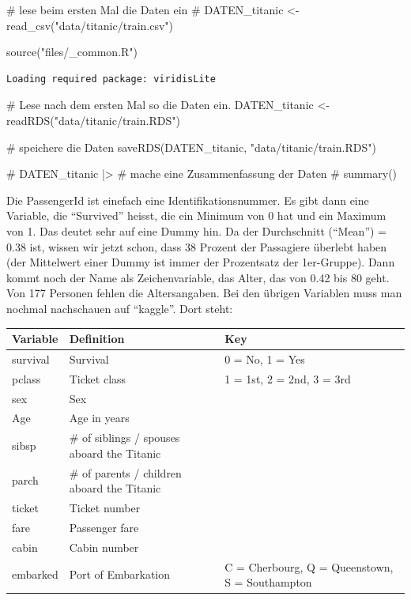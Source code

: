 \documentclass[
  10pt,
  letterpaper,
  a4paper, twoside]{scrreprt}
\newenvironment{Shaded}{\begin{snugshade}}{\end{snugshade}}
\newcommand{\CommentTok}[1]{\textcolor[rgb]{0.37,0.37,0.37}{#1}}
\newcommand{\FunctionTok}[1]{\textcolor[rgb]{0.28,0.35,0.67}{#1}}
\newcommand{\NormalTok}[1]{\textcolor[rgb]{0.00,0.23,0.31}{#1}}
\newcommand{\OtherTok}[1]{\textcolor[rgb]{0.00,0.23,0.31}{#1}}
\newcommand{\StringTok}[1]{\textcolor[rgb]{0.13,0.47,0.30}{#1}}
\begin{document}
\begin{Shaded}
\begin{Highlighting}[]
\CommentTok{\# lese beim ersten Mal die Daten ein}
\CommentTok{\# DATEN\_titanic \textless{}{-} read\_csv("data/titanic/train.csv") }

\FunctionTok{source}\NormalTok{(}\StringTok{"files/\_common.R"}\NormalTok{)}
\end{Highlighting}
\end{Shaded}

\begin{verbatim}
Loading required package: viridisLite
\end{verbatim}

\begin{Shaded}
\begin{Highlighting}[]
\CommentTok{\# Lese nach dem ersten Mal so die Daten ein.}
\NormalTok{DATEN\_titanic }\OtherTok{\textless{}{-}} \FunctionTok{readRDS}\NormalTok{(}\StringTok{"data/titanic/train.RDS"}\NormalTok{)}

\CommentTok{\# speichere die Daten}
\FunctionTok{saveRDS}\NormalTok{(DATEN\_titanic, }\StringTok{"data/titanic/train.RDS"}\NormalTok{) }

\CommentTok{\# DATEN\_titanic |\textgreater{} \# mache eine Zusammenfassung der Daten}
\CommentTok{\#   summary()}
\end{Highlighting}
\end{Shaded}

Die PassengerId ist einefach eine Identifikationsnummer. Es gibt dann
eine Variable, die \enquote{Survived} heisst, die ein Minimum von 0 hat
und ein Maximum von 1. Das deutet sehr auf eine Dummy hin. Da der
Durchschnitt (\enquote{Mean}) = 0.38 ist, wissen wir jetzt schon, dass
38 Prozent der Passagiere überlebt haben (der Mittelwert einer Dummy ist
immer der Prozentsatz der 1er-Gruppe). Dann kommt noch der Name als
Zeichenvariable, das Alter, das von 0.42 bis 80 geht. Von 177 Personen
fehlen die Altersangaben. Bei den übrigen Variablen muss man nochmal
nachschauen auf \enquote{kaggle}. Dort steht:

\begin{table}
\centering
\begin{tabular}{l|l|l}
\hline
Variable & Definition & Key\\
\hline
survival & Survival & 0 = No, 1 = Yes\\
\hline
pclass & Ticket class & 1 = 1st, 2 = 2nd, 3 = 3rd\\
\hline
sex & Sex & \\
\hline
Age & Age in years & \\
\hline
sibsp & \# of siblings / spouses aboard the Titanic & \\
\hline
parch & \# of parents / children aboard the Titanic & \\
\hline
ticket & Ticket number & \\
\hline
fare & Passenger fare & \\
\hline
cabin & Cabin number & \\
\hline
embarked & Port of Embarkation & C = Cherbourg, Q = Queenstown, S = Southampton\\
\hline
\end{tabular}
\end{table}
\end{document}
